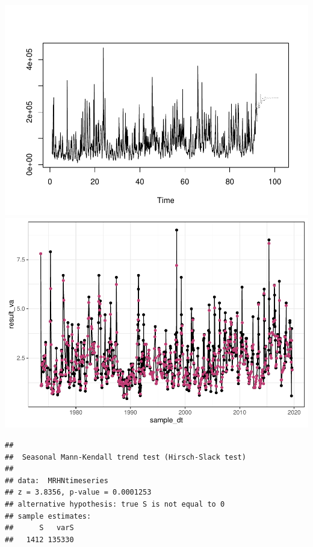 \documentclass[12pt,]{article}
\begin{document}
\includegraphics{Project_Template_files/figure-latex/unnamed-chunk-6-16.pdf}
\includegraphics{Project_Template_files/figure-latex/unnamed-chunk-6-17.pdf}

\begin{verbatim}
## 
##  Seasonal Mann-Kendall trend test (Hirsch-Slack test)
## 
## data:  MRHNtimeseries
## z = 3.8356, p-value = 0.0001253
## alternative hypothesis: true S is not equal to 0
## sample estimates:
##      S   varS 
##   1412 135330
\end{verbatim}
\end{document}
